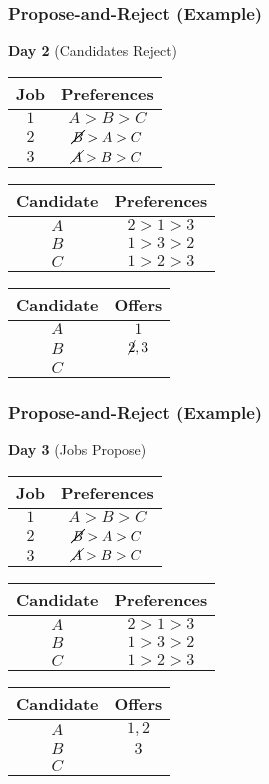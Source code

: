 \documentclass{beamer}
\begin{document}
\begin{frame}
    \frametitle{Propose-and-Reject (Example)}
    {\bf Day 2} (Candidates Reject)
    \begin{center}
        \begin{tabular}{c|c}
            Job & Preferences \\
            \hline
            $1$ & $A>B>C$\\
            $2$ & $\cancel{B}>A>C$\\
            $3$ & $\cancel{A}>B>C$
        \end{tabular}
        \hspace{10pt}
        \begin{tabular}{c|c}
            Candidate & Preferences \\
            \hline
            $A$ & $2>1>3$\\
            $B$ & $1>3>2$\\
            $C$ & $1>2>3$
        \end{tabular}
    \end{center}
    \begin{center}
        \begin{tabular}{c|c}
            Candidate & Offers \\
            \hline
            $A$ & $1$ \\
            $B$ & $\cancel{2},3$ \\
            $C$ & 
        \end{tabular}
    \end{center}
\end{frame}

\begin{frame}
    \frametitle{Propose-and-Reject (Example)}
    {\bf Day 3} (Jobs Propose)
    \begin{center}
        \begin{tabular}{c|c}
            Job & Preferences \\
            \hline
            $1$ & $A>B>C$\\
            $2$ & $\cancel{B}>A>C$\\
            $3$ & $\cancel{A}>B>C$
        \end{tabular}
        \hspace{10pt}
        \begin{tabular}{c|c}
            Candidate & Preferences \\
            \hline
            $A$ & $2>1>3$\\
            $B$ & $1>3>2$\\
            $C$ & $1>2>3$
        \end{tabular}
    \end{center}
    \begin{center}
        \begin{tabular}{c|c}
            Candidate & Offers \\
            \hline
            $A$ & $1,2$ \\
            $B$ & $3$ \\
            $C$ & 
        \end{tabular}
    \end{center}
\end{frame}
\end{document}
